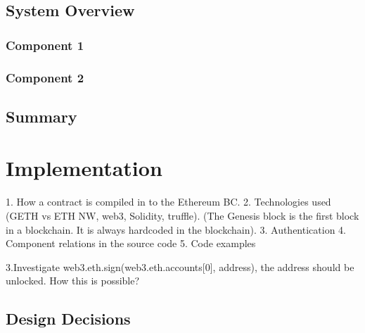 \section{System Overview}

\subsection{Component 1}

\subsection{Component 2}

\section{Summary}

\chapter{Implementation}

1. How a contract is compiled in to the Ethereum BC.
2. Technologies used (GETH vs ETH NW, web3, Solidity, truffle).
(The Genesis block is the first block in a blockchain. It is always hardcoded in the blockchain).
3. Authentication 
4. Component relations in the source code
5. Code examples

3.Investigate web3.eth.sign(web3.eth.accounts[0], address), the address should be unlocked. How this is possible?

\label{ch:implementation}



\section{Design Decisions}


